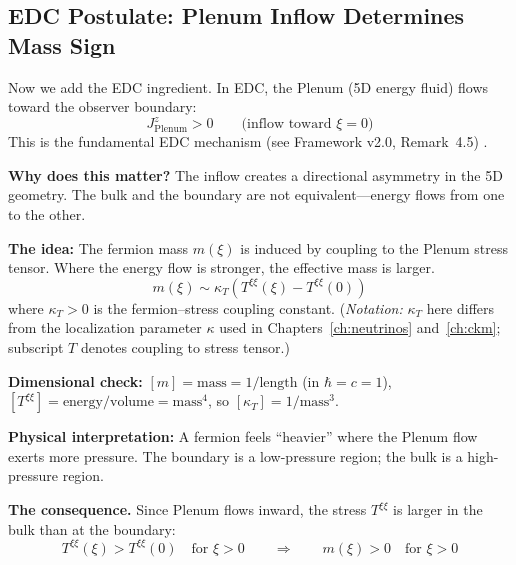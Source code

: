 \subsection{EDC Postulate: Plenum Inflow Determines Mass Sign}

Now we add the EDC ingredient. In EDC, the Plenum (5D energy fluid) flows toward
the observer boundary:
\begin{equation}
    J^z_{\text{Plenum}} > 0 \qquad \text{(inflow toward $\xi = 0$)}
    \label{eq:ch9_inflow}
\end{equation}
This is the fundamental EDC mechanism (see Framework v2.0, Remark~4.5) \tagP{}.

\textbf{Why does this matter?} The inflow creates a directional asymmetry in
the 5D geometry. The bulk and the boundary are not equivalent---energy flows
from one to the other.

\begin{tcolorbox}[colback=orange!5, colframe=orange!50!black,
    title=\textbf{Physical Hypothesis [P]}]
\textbf{The idea:} The fermion mass $m(\xi)$ is induced by coupling to the Plenum
stress tensor. Where the energy flow is stronger, the effective mass is larger.
\begin{equation}
    m(\xi) \sim \kappa_T \left( T^{\xi\xi}(\xi) - T^{\xi\xi}(0) \right)
    \label{eq:ch9_mass_from_stress}
\end{equation}
where $\kappa_T > 0$ is the fermion--stress coupling constant.
(\emph{Notation:} $\kappa_T$ here differs from the localization parameter $\kappa$
used in Chapters~\ref{ch:neutrinos} and~\ref{ch:ckm}; subscript $T$ denotes coupling
to stress tensor.)

\textbf{Dimensional check:} $[m] = \text{mass} = 1/\text{length}$ (in $\hbar = c = 1$),
$[T^{\xi\xi}] = \text{energy}/\text{volume} = \text{mass}^4$, so $[\kappa_T] = 1/\text{mass}^3$.

\textbf{Physical interpretation:} A fermion feels ``heavier'' where the Plenum
flow exerts more pressure. The boundary is a low-pressure region; the bulk
is a high-pressure region.
\end{tcolorbox}

\textbf{The consequence.} Since Plenum flows inward, the stress $T^{\xi\xi}$ is
larger in the bulk than at the boundary:
\begin{equation}
    T^{\xi\xi}(\xi) > T^{\xi\xi}(0) \quad \text{for } \xi > 0
    \qquad\Longrightarrow\qquad
    m(\xi) > 0 \quad \text{for } \xi > 0
    \label{eq:ch9_mass_positive}
\end{equation}

